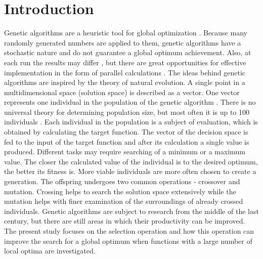 \documentclass[graybox]{styles/svmult}
\begin{document}

\section{Introduction}
\label{sec:1}

Genetic algorithms are a heuristic tool for global optimization \cite{balabanov-01}. Because many randomly generated numbers are applied to them, genetic algorithms have a stochastic nature and do not guarantee a global optimum achievement. Also, at each run the results may differ \cite{balabanov-02}, but there are great opportunities for effective implementation in the form of parallel calculations \cite{balabanov-03}. The ideas behind genetic algorithms are inspired by the theory of natural evolution. A single point in a multidimensional space (solution space) is described as a vector. One vector represents one individual in the population of the genetic algorithm \cite{balabanov-04}. There is no universal theory for determining population size, but most often it is up to 100 individuals \cite{alander-01}. Each individual in the population is a subject of evaluation, which is obtained by calculating the target function. The vector of the decision space is fed to the input of the target function and after its calculation a single value is produced. Different tasks may require searching of a minimum or a maximum value. The closer the calculated value of the individual is to the desired optimum, the better its fitness is. More viable individuals are more often chosen to create a generation. The offspring undergoes two common operations - crossover and mutation. Crossing helps to search the solution space extensively while the mutation helps with finer examination of the surroundings of already crossed individuals. Genetic algorithms are subject to research from the middle of the last century, but there are still areas in which their productivity can be improved. The present study focuses on the selection operation and how this operation can improve the search for a global optimum when functions with a large number of local optima are investigated.
\end{document}
